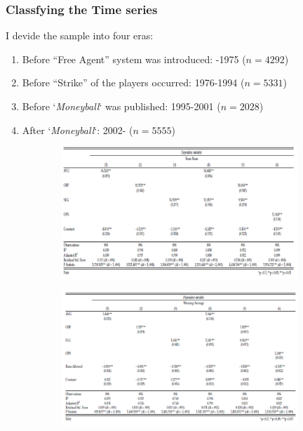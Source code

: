 \documentclass[dvipdfmx,12pt]{beamer}
\begin{document}
\begin{frame}\frametitle{Classfying the Time series}
  I devide the sample into four eras:

  \begin{enumerate}
    \item Before ``Free Agent'' system was introduced: -1975
    ($n = 4292$)

    \item Before ``Strike'' of the players occurred: 1976-1994
    ($n = 5331$)

    \item Before `\textit{Moneyball}` was published: 1995-2001
    ($n = 2028$)

    \item After `\textit{Moneyball}`: 2002-
    ($n = 5555$)
  \end{enumerate}
\end{frame}

\begin{frame}
  \scriptsize


  \begin{figure}
    \includegraphics[width = 11cm, height = 5cm]{fig_tab/mt_tab7.pdf}
\label{}
  \end{figure}
\end{frame}

\begin{frame}

  \begin{figure}
    \includegraphics[width = 11cm, height = 5cm]{fig_tab/mt_tab8.pdf}
\label{}
  \end{figure}
\end{frame}
\end{document}
